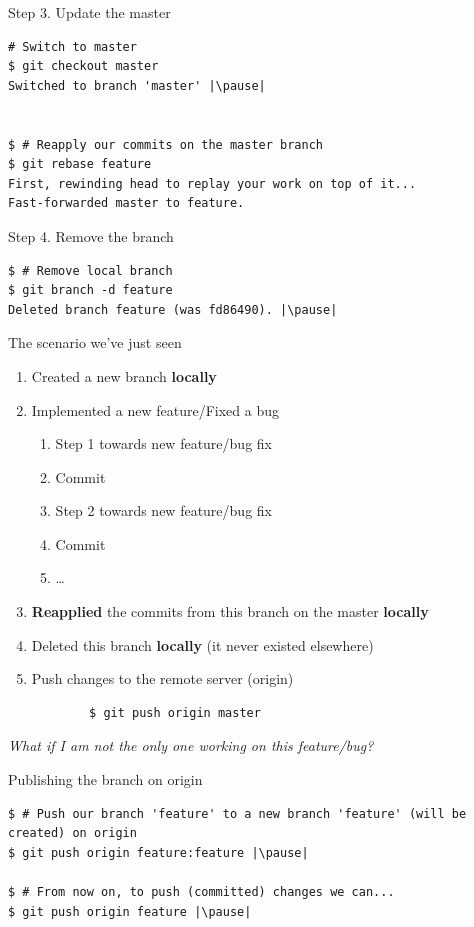 \begin{frame}[fragile]{Step 3. Update the master}
  	\begin{lstlisting}
# Switch to master
$ git checkout master
Switched to branch 'master' |\pause|


$ # Reapply our commits on the master branch
$ git rebase feature
First, rewinding head to replay your work on top of it...
Fast-forwarded master to feature.
	\end{lstlisting}
\end{frame}

\begin{frame}[fragile]{Step 4. Remove the branch}
  	\begin{lstlisting}
$ # Remove local branch
$ git branch -d feature
Deleted branch feature (was fd86490). |\pause|
	\end{lstlisting}
\end{frame}


\begin{frame}[fragile]{The scenario we've just seen}
	\begin{enumerate}
		\item Created a new branch \textbf{locally}
		\item Implemented a new feature/Fixed a bug
		\begin{enumerate}
			\item Step 1 towards new feature/bug fix
			\item Commit
			\item Step 2 towards new feature/bug fix
			\item Commit
			\item \ldots
		\end{enumerate}
		\item \textbf{Reapplied} the commits from this branch on the master \textbf{locally}
		\item Deleted this branch \textbf{locally} (it never existed elsewhere)
		\pause
		\item Push changes to the remote server (origin)
		\begin{lstlisting}
		$ git push origin master
		\end{lstlisting}
	\end{enumerate}
	\pause
	\textit{What if I am not the only one working on this feature/bug?}
\end{frame}

\begin{frame}[fragile]{Publishing the branch on origin}
	\begin{lstlisting}
$ # Push our branch 'feature' to a new branch 'feature' (will be created) on origin
$ git push origin feature:feature |\pause|

$ # From now on, to push (committed) changes we can...
$ git push origin feature |\pause|
	\end{lstlisting}
\end{frame}

